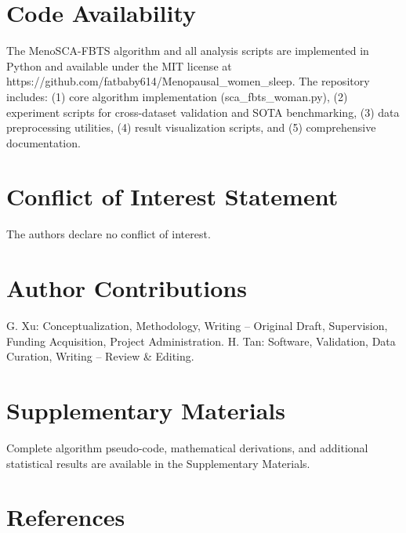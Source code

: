 \documentclass[a4paper,fleqn]{cas-dc}
\begin{document}
\section*{Code Availability}
The MenoSCA-FBTS algorithm and all analysis scripts are implemented in Python and available under the MIT license at https://github.com/fatbaby614/Menopausal_women_sleep. The repository includes: (1) core algorithm implementation (sca_fbts_woman.py), (2) experiment scripts for cross-dataset validation and SOTA benchmarking, (3) data preprocessing utilities, (4) result visualization scripts, and (5) comprehensive documentation.

\section*{Conflict of Interest Statement}
The authors declare no conflict of interest.

\section*{Author Contributions}
G. Xu: Conceptualization, Methodology, Writing -- Original Draft, Supervision, Funding Acquisition, Project Administration. H. Tan: Software, Validation, Data Curation, Writing -- Review \& Editing.

\section*{Supplementary Materials}

Complete algorithm pseudo-code, mathematical derivations, and additional statistical results are available in the Supplementary Materials.

\section{References}\label{sec6}
\end{document}
